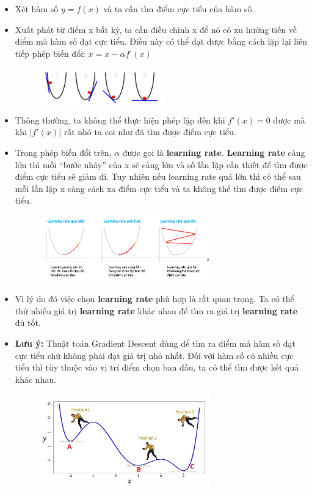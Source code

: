 \begin{itemize}
    \item Xét hàm số $y = f(x)$ và ta cần tìm điểm cực tiểu của hàm số.
    \item Xuất phát từ điểm x bất kỳ, ta cần điều chỉnh x để nó có xu hướng tiến về điểm mà hàm số đạt cực tiểu. Điều này có thể đạt được bằng cách lặp lại liên tiếp phép biến đổi: $x = x - \alpha f’(x)$
        \begin{figure}[H]
        \centering
        \includegraphics[width=0.5\textwidth]{image/bt5/lt_mh.jpg}
        \end{figure}
     \item Thông thường, ta không thể thực hiện phép lặp đến khi $f'(x) = 0$ được mà khi $|f'(x)|$ rất nhỏ ta coi như đã tìm được điểm cực tiểu.
     \item Trong phép biến đổi trên, $\alpha$ được gọi là \textbf{learning rate}. \textbf{Learning rate} càng lớn thì mỗi “bước nhảy” của x sẽ càng lớn và số lần lặp cần thiết để tìm được điểm cực tiểu sẽ giảm đi. Tuy nhiên nếu learning rate quá lớn thì có thể sau mỗi lần lặp x càng cách xa điểm cực tiểu và ta không thể tìm được điểm cực tiểu.
        \begin{figure}[H]
        \centering
        \includegraphics[width=0.7\textwidth]{image/bt5/lt_rate.jpg}
        \end{figure}
     \item Vì lý do đó việc chọn \textbf{learning rate} phù hợp là rất quan trọng. Ta có thể thử nhiều giá trị \textbf{learning rate} khác nhau để tìm ra giá trị \textbf{learning rate} đủ tốt.
     \item \textbf{Lưu ý: } Thuật toán Gradient Descent dùng để tìm ra điểm mà hàm số đạt cực tiểu chứ không phải đạt giá trị nhỏ nhất. Đối với hàm số có nhiều cực tiểu thì tùy thuộc vào vị trí điểm chọn ban đầu, ta có thể tìm được kết quả khác nhau. 
        \begin{figure}[H]
        \centering
        \includegraphics[width=0.7\textwidth]{image/bt5/lt_rateah.jpg}

\end{figure}
\end{itemize}
